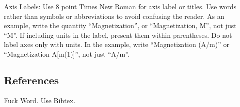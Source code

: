 \documentclass[10pt]{article}
\begin{document}
%
%
%

Axis Labels: Use 8 point Times New Roman for axis label or titles. Use words rather than symbols or abbreviations to avoid confusing the reader. As an example, write the quantity “Magnetization”, or “Magnetization, M”, not just “M”. If including units in the label, present them within parentheses. Do not label axes only with units. In the example, write “Magnetization (A/m)” or “Magnetization {A[m(1)]}”, not just “A/m”. 

\subsection{References}
Fuck Word. Use Bibtex. 
\end{document}
